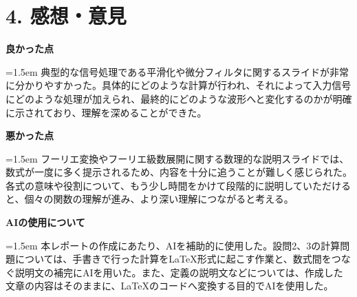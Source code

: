 \documentclass[11pt,a4paper]{jlreq}
\begin{document}
\section*{4. 感想・意見}

\textbf{良かった点}

{\leftskip=1.5em
\noindent 典型的な信号処理である平滑化や微分フィルタに関するスライドが非常に分かりやすかった。具体的にどのような計算が行われ、それによって入力信号にどのような処理が加えられ、最終的にどのような波形へと変化するのかが明確に示されており、理解を深めることができた。
\par}

\textbf{悪かった点}

{\leftskip=1.5em
\noindent フーリエ変換やフーリエ級数展開に関する数理的な説明スライドでは、数式が一度に多く提示されるため、内容を十分に追うことが難しく感じられた。各式の意味や役割について、もう少し時間をかけて段階的に説明していただけると、個々の関数の理解が進み、より深い理解につながると考える。
\par}

\vspace{1em}
\noindent\textbf{AIの使用について}

{\leftskip=1.5em
\noindent 本レポートの作成にあたり、AIを補助的に使用した。設問2、3の計算問題については、手書きで行った計算をLaTeX形式に起こす作業と、数式間をつなぐ説明文の補完にAIを用いた。また、定義の説明文などについては、作成した文章の内容はそのままに、LaTeXのコードへ変換する目的でAIを使用した。
\par}
\end{document}
